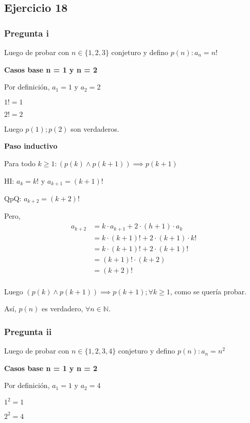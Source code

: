 \subsection{Ejercicio 18}

\subsubsection{Pregunta i}

Luego de probar con $ n \in \{ 1,2,3 \} $ conjeturo y defino $ p(n): a_n = n! $

\textbf{Casos base n = 1 y n = 2}

Por definición, $a_1 = 1$ y $a_2 = 2$

$ 1! = 1$

$ 2! = 2 $

Luego $ p(1); p(2) $ son verdaderos.

\textbf{Paso inductivo}

Para todo $k \geq 1: (p(k) \wedge p(k+1)) \implies p(k+1)$

HI: $ a_k = k! $ y $ a_{k+1} = (k+1)! $

QpQ: $ a_{k+2} = (k+2)!$

Pero,
\begin{align*}
    a_{k+2} &= k \cdot a_{k+1} +2\cdot (h+1) \cdot a_k \\
    &= k \cdot (k+1)! +2\cdot (k+1) \cdot k! \\
    &= k \cdot (k+1)! +2\cdot (k+1)! \\
    &= (k+1)! \cdot (k+2) \\
    &= (k+2)! \\
\end{align*}

Luego $(p(k) \wedge p(k+1)) \implies p(k+1); \forall k \geq 1$, como se quería probar.

Así, $p(n)$ es verdadero, $\forall n \in \mathbb{N}$.

\subsubsection{Pregunta ii}

Luego de probar con $ n \in \{ 1,2,3,4 \} $ conjeturo y defino $ p(n): a_n = n^2 $

\textbf{Casos base n = 1 y n = 2}

Por definición, $a_1 = 1$ y $a_2 = 4$

$ 1^2 = 1$

$ 2^2 = 4 $

